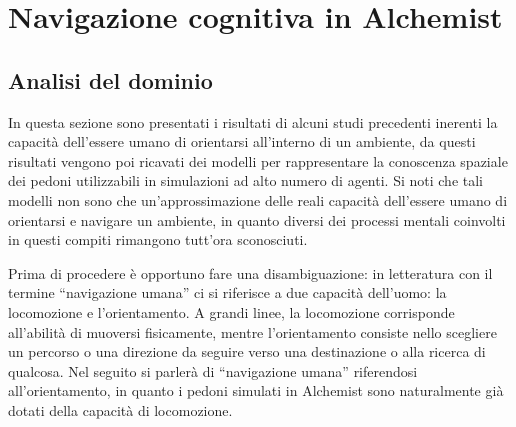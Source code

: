 \documentclass[12pt,a4paper,openright,oneside]{book}
\begin{document}
\chapter{Navigazione cognitiva in Alchemist}
\label{chap:development}

\section{Analisi del dominio}
In questa sezione sono presentati i risultati di alcuni studi precedenti inerenti la capacità dell’essere umano di orientarsi all’interno di un ambiente, da questi risultati vengono poi ricavati dei modelli per rappresentare la conoscenza spaziale dei pedoni utilizzabili in simulazioni ad alto numero di agenti. Si noti che tali modelli non sono che un’approssimazione delle reali capacità dell’essere umano di orientarsi e navigare un ambiente, in quanto diversi dei processi mentali coinvolti in questi compiti rimangono tutt’ora sconosciuti.

Prima di procedere è opportuno fare una disambiguazione: in letteratura con il termine “navigazione umana” ci si riferisce a due capacità dell’uomo: la locomozione e l’orientamento. A grandi linee, la locomozione corrisponde all’abilità di muoversi fisicamente, mentre l’orientamento consiste nello scegliere un percorso o una direzione da seguire verso una destinazione o alla ricerca di qualcosa. Nel seguito si parlerà di “navigazione umana” riferendosi all’orientamento, in quanto i pedoni simulati in Alchemist sono naturalmente già dotati della capacità di locomozione.
\end{document}
